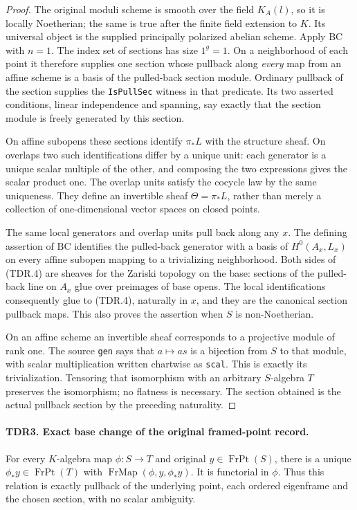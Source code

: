 \documentclass[11pt,a4paper]{article}
\numberwithin{equation}{section}
\theoremstyle{remark}\newtheorem{remark}[theorem]{Remark}
\begin{document}
\begin{proof}
The original moduli scheme is smooth over the field \(K_A(l)\),
so it is locally Noetherian; the same is true after the finite field
extension to \(K\).  Its universal object is the supplied principally
polarized abelian scheme.  Apply \(\mathrm{BC}\) with \(n=1\).
The index set of sections has size \(1^g=1\).  On a neighborhood
of each point it therefore supplies one section whose pullback along
\emph{every} map from an affine scheme is a basis of the pulled-back
section module.  Ordinary pullback of the section supplies the
\texttt{Is\allowbreak Pull\allowbreak Sec} witness in that predicate.  Its two asserted
conditions, linear independence and spanning, say exactly that the
section module is freely generated by this section.

On affine subopens these sections identify \(\pi_*L\) with the
structure sheaf.  On overlaps two such identifications differ by a
unique unit: each generator is a unique scalar multiple of the other,
and composing the two expressions gives the scalar product one.
The overlap units satisfy the cocycle law by the same uniqueness.
They define an invertible sheaf \(\Theta=\pi_*L\), rather than
merely a collection of one-dimensional vector spaces on closed points.

The same local generators and overlap units pull back along any
\(x\).  The defining assertion of \(\mathrm{BC}\) identifies the
pulled-back generator with a basis of \(H^0(A_x,L_x)\) on every
affine subopen mapping to a trivializing neighborhood.  Both sides
of (TDR.4) are sheaves for the Zariski topology on the base: sections
of the pulled-back line on \(A_x\) glue over preimages of base
opens.  The local identifications consequently glue to (TDR.4),
naturally in \(x\), and they are the canonical section pullback
maps.  This also proves the assertion when \(S\) is non-Noetherian.

On an affine scheme an invertible sheaf corresponds to a projective
module of rank one.  The source \texttt{gen} says that
\(a\mapsto a s\) is a bijection from \(S\) to that module,
with scalar multiplication written chartwise as \texttt{scal}.
This is exactly its trivialization.  Tensoring that isomorphism with
an arbitrary \(S\)-algebra \(T\) preserves the isomorphism;
no flatness is necessary.  The section obtained is the actual
pullback section by the preceding naturality.
\end{proof}

\paragraph{TDR3. Exact base change of the original framed-point record.}
\label{claim:TDR3}
For every \(K\)-algebra map \(\phi:S\to T\) and original
\(y\in\operatorname{FrPt}(S)\), there is a unique
\(\phi_*y\in\operatorname{FrPt}(T)\) with
\(\operatorname{FrMap}(\phi,y,\phi_*y)\).
It is functorial in \(\phi\).  Thus this relation is exactly
pullback of the underlying point, each ordered eigenframe and the
chosen section, with no scalar ambiguity.
\end{document}
